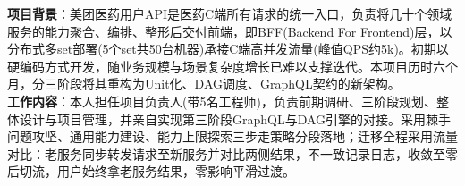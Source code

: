 \documentclass{resume}
\begin{document}
\begin{onehalfspacing}
\textbf{项目背景}：美团医药用户API是医药C端所有请求的统一入口，负责将几十个领域服务的能力聚合、编排、整形后交付前端，即BFF(Backend For Frontend)层，以分布式多set部署(5个set共50台机器)承接C端高并发流量(峰值QPS约5k)。初期以硬编码方式开发，随业务规模与场景复杂度增长已难以支撑迭代。本项目历时六个月，分三阶段将其重构为Unit化、DAG调度、GraphQL契约的新架构。\\

\textbf{工作内容}：本人担任项目负责人(带5名工程师)，负责前期调研、三阶段规划、整体设计与项目管理，并亲自实现第三阶段GraphQL与DAG引擎的对接。采用棘手问题攻坚、通用能力建设、能力上限探索三步走策略分段落地；迁移全程采用流量对比：老服务同步转发请求至新服务并对比两侧结果，不一致记录日志，收敛至零后切流，用户始终拿老服务结果，零影响平滑过渡。\\


\end{onehalfspacing}
\end{document}
